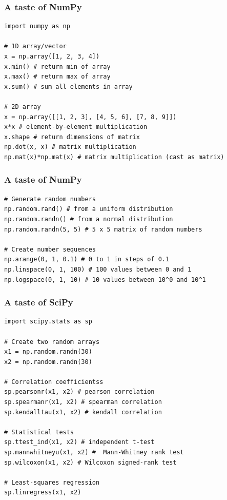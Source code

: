 \documentclass[pdf]{beamer}
\begin{document}
\begin{frame}[fragile]
\frametitle{A taste of NumPy}

\begin{lstlisting}[style=python]
import numpy as np

# 1D array/vector
x = np.array([1, 2, 3, 4])
x.min() # return min of array 
x.max() # return max of array
x.sum() # sum all elements in array

# 2D array
x = np.array([[1, 2, 3], [4, 5, 6], [7, 8, 9]])
x*x # element-by-element multiplication
x.shape # return dimensions of matrix
np.dot(x, x) # matrix multiplication
np.mat(x)*np.mat(x) # matrix multiplication (cast as matrix)
\end{lstlisting}

\end{frame}

\begin{frame}[fragile]
\frametitle{A taste of NumPy}

\begin{lstlisting}[style=python]
# Generate random numbers
np.random.rand() # from a uniform distribution
np.random.randn() # from a normal distribution
np.random.randn(5, 5) # 5 x 5 matrix of random numbers

# Create number sequences
np.arange(0, 1, 0.1) # 0 to 1 in steps of 0.1
np.linspace(0, 1, 100) # 100 values between 0 and 1
np.logspace(0, 1, 10) # 10 values between 10^0 and 10^1
\end{lstlisting}

\end{frame}

\begin{frame}[fragile]
\frametitle{A taste of SciPy}

\begin{lstlisting}[style=python]
import scipy.stats as sp

# Create two random arrays
x1 = np.random.randn(30)
x2 = np.random.randn(30)

# Correlation coefficientss
sp.pearsonr(x1, x2) # pearson correlation
sp.spearmanr(x1, x2) # spearman correlation
sp.kendalltau(x1, x2) # kendall correlation

# Statistical tests
sp.ttest_ind(x1, x2) # independent t-test
sp.mannwhitneyu(x1, x2) #  Mann-Whitney rank test 
sp.wilcoxon(x1, x2) # Wilcoxon signed-rank test

# Least-squares regression
sp.linregress(x1, x2)
\end{lstlisting}

\end{frame}
\end{document}
